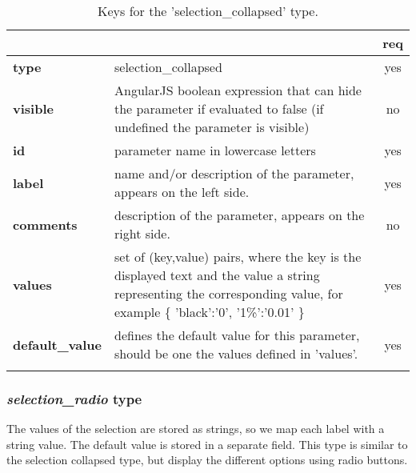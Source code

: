 \begin{longtable}{|>{\bf}L{\linewidth}|L{\linewidth}|c|}
\hline
      &  & {\bf req} 
\tabularnewline \hline \hline
 type  & selection\_collapsed    & yes \\ \hline
 visible  & AngularJS boolean expression that can hide the parameter if
            evaluated to false (if undefined the parameter is visible)& no \\ \hline
 id     & parameter name in lowercase letters & yes \\ \hline
 label  & name and/or description of the parameter, appears on the left side. & yes
                      \\ \hline
 comments & description of the parameter, appears on the right side. & no
                      \\ \hline
 values & set of (key,value) pairs, where the key is the displayed text and the 
value a string representing the corresponding value, for example \{ 
'black':'0', '1\%':'0.01' \} & yes
                      \\ \hline
 default\_value & defines the default value for this parameter, should be one 
the values defined in 'values'. & yes \\ \hline
\caption{Keys for the 'selection\_collapsed' type.}
\end{longtable}

\subsubsection{ \emph{selection\_radio} type}

The values of the selection are stored as strings, so we map each label with a 
string value. The default value is stored in a separate field.
This type is similar to the selection collapsed type, but display the different
options using radio buttons.

